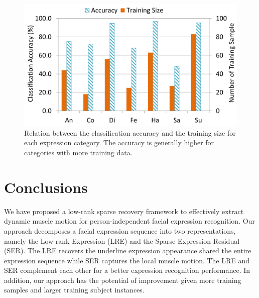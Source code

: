 \documentclass[journal]{IEEEtran}
\begin{document}
\begin{figure}[htbp]
	\centering
		\includegraphics[width=.8\columnwidth]{pics/fig_ck_size.png}
	\caption{Relation between the classification accuracy and the training size for each expression category. The accuracy is generally higher for categories with more training data.}
	\label{fig:fig_ck_size}
\end{figure}



\section{Conclusions\label{sec:conclude}}
We have proposed a low-rank sparse recovery framework to effectively extract dynamic muscle motion for person-independent facial expression recognition. Our approach decomposes a facial expression sequence into two representations, namely the Low-rank Expression (LRE) and the Sparse Expression Residual (SER). The LRE recovers the underline expression appearance shared the entire expression sequence while SER captures the local muscle motion. The LRE and SER complement each other for a better expression recognition performance. In addition, our approach has the potential of improvement given more training samples and larger training subject instances. 


\ifCLASSOPTIONcaptionsoff
  \newpage
\fi









\end{document}
